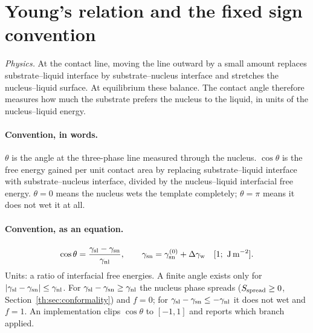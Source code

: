 \section{Young's relation and the fixed sign convention}\label{th:sec:young}

\textit{Physics.} At the contact line, moving the line outward by a small amount replaces
substrate--liquid interface by substrate--nucleus interface and stretches the nucleus--liquid
surface. At equilibrium these balance. The contact angle therefore measures how much the
substrate prefers the nucleus to the liquid, in units of the nucleus--liquid energy.

\paragraph{Convention, in words.} $\theta$ is the angle at the three-phase line measured through
the nucleus. $\cos\theta$ is the free energy gained per unit contact area by replacing
substrate--liquid interface with substrate--nucleus interface, divided by the nucleus--liquid
interfacial free energy. $\theta=0$ means the nucleus wets the template completely; $\theta=\pi$
means it does not wet it at all.

\paragraph{Convention, as an equation.}
\begin{equation}\label{th:eq:young}
\cos\theta=\frac{\gsl-\gsn}{\gnl},\qquad \gsn=\gsnz+\dgw \un{1;\ J\,m^{-2}}.
\end{equation}
Units: a ratio of interfacial free energies. A finite angle exists only for
$|\gamma_\mathrm{sl}-\gamma_\mathrm{sn}|\le\gamma_\mathrm{nl}$. For $\gamma_\mathrm{sl}-\gamma_\mathrm{sn}\ge\gamma_\mathrm{nl}$ the nucleus phase spreads ($S_\mathrm{spread}\ge0$,
Section~\ref{th:sec:conformality}) and $f=0$; for $\gamma_\mathrm{sl}-\gamma_\mathrm{sn}\le-\gamma_\mathrm{nl}$ it does not wet and $f=1$.
An implementation clips $\cos\theta$ to $[-1,1]$ and reports which branch applied.


